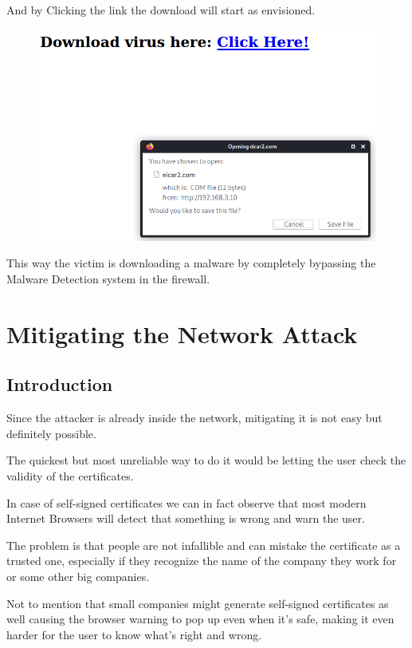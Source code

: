 And by Clicking the link the download will start as envisioned.

\begin{figure}[h!]
 \centering
 \includegraphics[width=13cm]{img/after_proxy.png}
\end{figure}

This way the victim is downloading a malware by completely bypassing the Malware Detection system in the firewall.


\newpage

\chapter{Mitigating the Network Attack}

\section{Introduction}

Since the attacker is already inside the network, mitigating it is not easy but definitely possible.

The quickest but most unreliable way to do it would be letting the user check the validity of the certificates.

In case of self-signed certificates we can in fact observe that most modern Internet Browsers will detect that something is wrong and warn the user.

The problem is that people are not infallible and can mistake the certificate as a trusted one, especially if they recognize the name of the company they work for or some other big companies.

Not to mention that small companies might generate self-signed certificates as well causing the browser warning to pop up even when it's safe, making it even harder for the user to know what's right and wrong.

